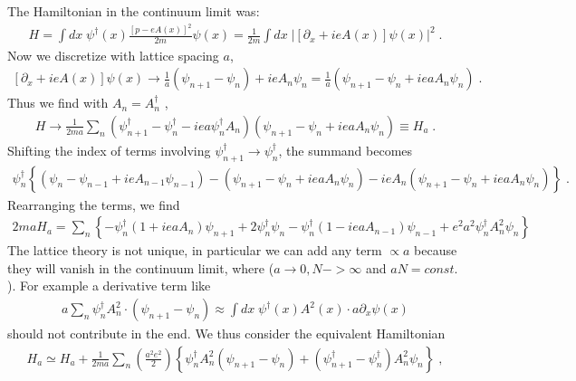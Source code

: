 \documentclass[10pt]{article}
\begin{document}
The Hamiltonian in the continuum limit was:
\begin{eqnarray}
H = \int dx \; \psi^\dagger(x) \frac{\left[p-eA(x)\right]^2}{2m} \psi(x) = \frac{1}{2m} \int dx \; \left|\left[\partial_x + ie A(x) \right]\psi(x)\right|^2\; .
\end{eqnarray}
Now we discretize with lattice spacing $a$,
\begin{eqnarray}
\left[\partial_x + ie A(x) \right]\psi(x) \rightarrow \frac{1}{a}\left(\psi_{n+1} - \psi_n\right)  + ie A_n \psi_n = \frac{1}{a} \left(\psi_{n+1} - \psi_n +iea A_n \psi_n\right) \; .
\end{eqnarray}
Thus we find with $A_n = A_n^\dagger$ \; ,
\begin{align}
H \rightarrow \frac{1}{2m a} \sum_n \left(\psi_{n+1}^\dagger - \psi_n^\dagger - iea \psi_n^\dagger A_n\right) \left(\psi_{n+1} - \psi_n +iea A_n \psi_n\right) \equiv H_a \; .
\end{align}
Shifting the index of terms involving $\psi_{n+1}^\dagger \rightarrow \psi_n^\dagger$, the summand becomes
\begin{align}
\psi_n^\dagger \left\lbrace\left(\psi_n -\psi_{n-1} +ie A_{n-1} \psi_{n-1}\right) - \left(\psi_{n+1} - \psi_n +iea A_n \psi_n\right) -ie A_n \left(\psi_{n+1} - \psi_n +iea A_n \psi_n\right)\right\rbrace \; .
\end{align}
Rearranging the terms, we find
\begin{align}
2ma H_a = \sum_n \left\lbrace -\psi_n^\dagger \left(1 + iea A_n\right) \psi_{n+1} + 2\psi_n^\dagger \psi_n - \psi_n^\dagger \left(1-ieaA_{n-1}\right)\psi_{n-1} +e^2 a^2 \psi_n^\dagger A_n^2 \psi_n\right\rbrace 
\end{align}
The lattice theory is not unique, in particular we can add any term $\propto a$ because they will vanish in the continuum limit, where ($a\rightarrow 0, N -> \infty$ and  $aN = const.$). For example a derivative term like
\begin{align}
a\sum_n \psi_n^\dagger A_n^2  \cdot \left(\psi_{n+1} - \psi_n\right) \approx \int dx \; \psi^\dagger(x) A^2(x) \cdot  a \partial_x \psi(x)
\end{align}
should not contribute in the end. We thus consider the equivalent Hamiltonian
\begin{align}
H_a \simeq H_a + \frac{1}{2ma} \sum_n \left(\frac{a^2 e^2}{2}\right) \left\lbrace\psi_n^\dagger A_n^2 \left(\psi_{n+1} - \psi_n\right) + \left(\psi_{n+1}^\dagger - \psi_n^\dagger\right)A_n^2 \psi_n\right\rbrace \; ,
\end{align}
\end{document}
